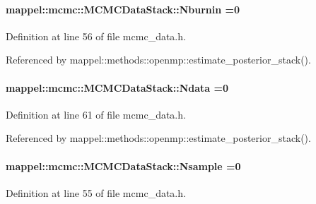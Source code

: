 \paragraph[{\texorpdfstring{Nburnin}{Nburnin}}]{ mappel\+::mcmc\+::\+M\+C\+M\+C\+Data\+Stack\+::\+Nburnin =0}\hypertarget{structmappel_1_1mcmc_1_1MCMCDataStack_a4a3aa4a67be9322e19c2e4c649cbdf8e}{}\label{structmappel_1_1mcmc_1_1MCMCDataStack_a4a3aa4a67be9322e19c2e4c649cbdf8e}


Definition at line 56 of file mcmc\+\_\+data.\+h.



Referenced by mappel\+::methods\+::openmp\+::estimate\+\_\+posterior\+\_\+stack().

\paragraph[{\texorpdfstring{Ndata}{Ndata}}]{ mappel\+::mcmc\+::\+M\+C\+M\+C\+Data\+Stack\+::\+Ndata =0}\hypertarget{structmappel_1_1mcmc_1_1MCMCDataStack_a2bcf8c7db4bf1df3c40c8d4b34db90d3}{}\label{structmappel_1_1mcmc_1_1MCMCDataStack_a2bcf8c7db4bf1df3c40c8d4b34db90d3}


Definition at line 61 of file mcmc\+\_\+data.\+h.



Referenced by mappel\+::methods\+::openmp\+::estimate\+\_\+posterior\+\_\+stack().

\paragraph[{\texorpdfstring{Nsample}{Nsample}}]{ mappel\+::mcmc\+::\+M\+C\+M\+C\+Data\+Stack\+::\+Nsample =0}\hypertarget{structmappel_1_1mcmc_1_1MCMCDataStack_a6a16373d9b85da2bf07f5e225419838d}{}\label{structmappel_1_1mcmc_1_1MCMCDataStack_a6a16373d9b85da2bf07f5e225419838d}


Definition at line 55 of file mcmc\+\_\+data.\+h.



